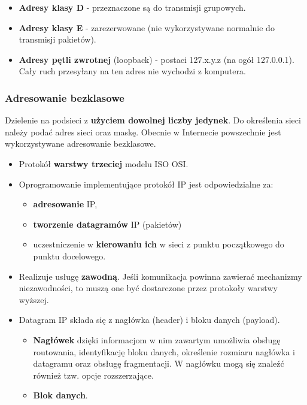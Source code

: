 \documentclass[12pt]{article}
\begin{document}
    \begin{itemize}
        \item \textbf{Adresy klasy D} - przeznaczone są do transmisji grupowych.
        \item \textbf{Adresy klasy E} - zarezerwowane (nie wykorzystywane normalnie do transmisji pakietów).
        \item \textbf{Adresy pętli zwrotnej} (loopback) - postaci 127.x.y.z (na ogół 127.0.0.1). Cały ruch przesyłany na ten adres nie wychodzi z komputera.
    \end{itemize}


    \subsubsection{Adresowanie bezklasowe}
    Dzielenie na podsieci z \textbf{użyciem dowolnej liczby jedynek}. Do określenia sieci należy podać adres
    sieci oraz maskę. Obecnie w Internecie powszechnie jest wykorzystywane adresowanie
    bezklasowe.

    \begin{itemize}
        \item Protokół \textbf{warstwy trzeciej} modelu ISO OSI.
        \item Oprogramowanie implementujące protokół IP jest odpowiedzialne za:
        \begin{itemize}
            \item \textbf{adresowanie} IP,
            \item \textbf{tworzenie datagramów} IP (pakietów)
            \item uczestniczenie w \textbf{kierowaniu ich} w sieci z punktu początkowego do punktu docelowego.
        \end{itemize}
        \item Realizuje usługę \textbf{zawodną}. Jeśli komunikacja powinna zawierać mechanizmy niezawodności, to muszą one być dostarczone przez protokoły warstwy wyższej.
        \item Datagram IP składa się z nagłówka (header) i bloku danych (payload).
        \begin{itemize}
            \item \textbf{Nagłówek} dzięki informacjom w nim zawartym umożliwia obsługę routowania, identyfikację bloku danych, określenie rozmiaru nagłówka i datagramu oraz obsługę fragmentacji. W nagłówku mogą się znaleźć również tzw. opcje rozszerzające.
            \item \textbf{Blok danych}.
        \end{itemize}
    \end{itemize}
\end{document}
